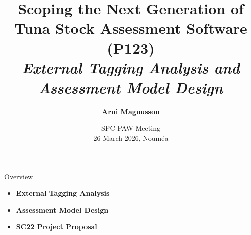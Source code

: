 \documentclass[aspectratio=169]{beamer}
\begin{document}
\begin{frame}
  \title{\vspace{-5ex}\darkblue Scoping the Next Generation of\\[0.6ex]
    Tuna Stock Assessment Software (P123)\\[2ex]
    \it\large\darkgray External Tagging Analysis and Assessment Model Design}
  \author{\vspace{-10ex}\darkgray\bf Arni Magnusson}
  \date{\darkgreen SPC PAW Meeting\\[0.5ex]
    26 March 2026, Nouméa}
  \titlepage
\end{frame}


\begin{frame}{Overview}
  \vspace{2ex}
  \begin{itemize}
    \item[] {\bf\darkblue External Tagging Analysis}
    \\[6ex]
    \item[] {\bf\darkblue Assessment Model Design}
    \\[6ex]
    \item[] {\bf\darkblue SC22 Project Proposal}
    \\[6ex]
  \end{itemize}
\end{frame}

\end{document}
